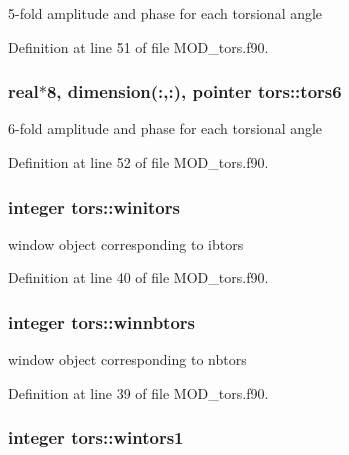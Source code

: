 5-\/fold amplitude and phase for each torsional angle 



Definition at line 51 of file M\-O\-D\-\_\-tors.\-f90.

\hypertarget{classtors_a814ae2dad20ccab069451bd283eedcf9}{
\subsubsection[{tors6}]{\setlength{\rightskip}{0pt plus 5cm}real$\ast$8, dimension(\-:,\-:), pointer tors\-::tors6}}\label{classtors_a814ae2dad20ccab069451bd283eedcf9}


6-\/fold amplitude and phase for each torsional angle 



Definition at line 52 of file M\-O\-D\-\_\-tors.\-f90.

\hypertarget{classtors_a4dd43f0fddaea87e391cb9579dc3c474}{
\subsubsection[{winitors}]{\setlength{\rightskip}{0pt plus 5cm}integer tors\-::winitors}}\label{classtors_a4dd43f0fddaea87e391cb9579dc3c474}


window object corresponding to ibtors 



Definition at line 40 of file M\-O\-D\-\_\-tors.\-f90.

\hypertarget{classtors_a556d53e79c9d029d13359b1e5059c3f1}{
\subsubsection[{winnbtors}]{\setlength{\rightskip}{0pt plus 5cm}integer tors\-::winnbtors}}\label{classtors_a556d53e79c9d029d13359b1e5059c3f1}


window object corresponding to nbtors 



Definition at line 39 of file M\-O\-D\-\_\-tors.\-f90.

\hypertarget{classtors_ae73f518b14ddfb4f52d4a837d7cd19b5}{
\subsubsection[{wintors1}]{\setlength{\rightskip}{0pt plus 5cm}integer tors\-::wintors1}}\label{classtors_ae73f518b14ddfb4f52d4a837d7cd19b5}


